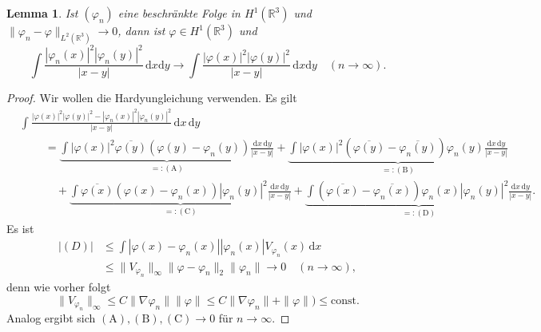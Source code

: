 \documentclass[
paper=a4,
bibtotocnumbered,
liststotocnumbered,
tablecaptionabove,
pointlessnumbers,
twoside,
openright,
10pt
]
{report}
\let\phi\varphi
\newtheorem{lem}[thm]{Lemma}
\theoremstyle{definition}
\numberwithin{equation}{chapter}
\begin{document}
\begin{lem}\label{9.6}
Ist $(\phi_n)$ eine beschränkte Folge in $H^1(\mathbb R^3)$ und $\|\phi_n - \phi\|_{L^2(\mathbb R^3)}\to 0$, dann ist $\phi \in H^1(\mathbb R^3)$ und
\begin{equation}
\int \frac{|\phi_n(x)|^2|\phi_n(y)|^2}{|x-y|} \, \mathrm dx \mathrm dy \to \int \frac{|\phi(x)|^2|\phi(y)|^2}{|x-y|} \, \mathrm dx \mathrm dy \quad (n\to \infty).
\end{equation}
\end{lem}
\begin{proof}
Wir wollen die Hardyungleichung verwenden. Es gilt
\begin{align*}
&\int \frac{|\phi(x)|^2 |\phi(y)|^2 - |\phi_n(x)|^2|\phi_n(y)|^2}{|x-y|}\, \mathrm dx \, \mathrm dy\\
&\ \qquad = \underbrace{\int  |\phi(x)|^2 \overline{\phi(y)} (\phi(y)- \phi_n(y)) \frac{\mathrm dx\, \mathrm dy}{|x-y|}}_{=:(\mathrm A)} + \underbrace{\int  |\phi(x)|^2 (\overline{\phi(y)}- \overline{\phi_n(y)}) \phi_n(y) \frac{\mathrm dx\, \mathrm dy}{|x-y|}}_{=:(\mathrm B)}\\
&\ \qquad\quad +\underbrace{\int  \overline{\phi(x)} (\phi(x)- \phi_n(x)) |\phi_n(y)|^2 \frac{\mathrm dx\, \mathrm dy}{|x-y|}}_{=:(\mathrm C)} + \underbrace{\int   (\overline{\phi(x)}- \overline{\phi_n(x)}) \phi_n(x) |\phi_n(y)|^2 \frac{\mathrm dx\, \mathrm dy}{|x-y|}}_{=:(\mathrm D)}.
\end{align*}
Es ist
\begin{align*}
|(D)|&\le \int |\phi(x)-\phi_n(x)| |\phi_n(x)| V_{\phi_n}(x) \, \mathrm dx \\
 &\le \| V_{\phi_n}\|_\infty \| \phi- \phi_n\|_2 \| \phi_n\| \to 0 \quad (n\to \infty),
\end{align*}
denn wie vorher folgt
\begin{equation}
\|V_{\phi_n}\|_\infty \le C\| \nabla \phi_n\| \| \phi\| \le C \| \nabla \phi_n\| + \| \phi\|) \le \text{const.}
\end{equation}
Analog ergibt sich $(\mathrm A), (\mathrm B), (\mathrm C)\to 0$ für $n\to \infty$.
\end{proof}
\end{document}
